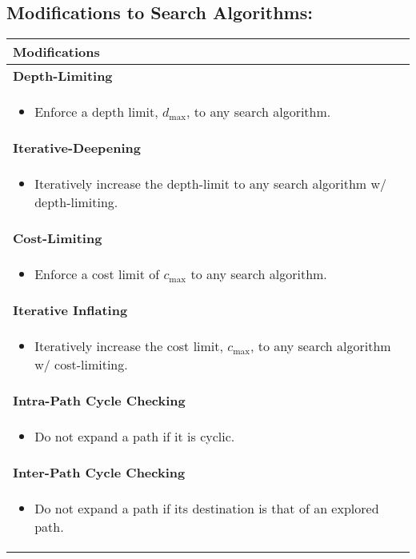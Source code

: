 \subsection{Modifications to Search Algorithms:}
\begin{summary}
    \begin{center}
        \begin{tabular}{l}
        \toprule
        \textbf{Modifications} \\
        \midrule
        \textbf{Depth-Limiting} \\
        \multicolumn{1}{p{\linewidth}}{
        \begin{itemize}
            \item Enforce a depth limit, $d_{\text{max}}$, to any search algorithm.
        \end{itemize}} \\
        \midrule
        \textbf{Iterative-Deepening} \\
        \multicolumn{1}{p{\linewidth}}{
        \begin{itemize}
            \item Iteratively increase the depth-limit to any search algorithm w/ depth-limiting.
        \end{itemize}} \\
        \midrule
        \textbf{Cost-Limiting} \\
        \multicolumn{1}{p{\linewidth}}{
        \begin{itemize}
            \item Enforce a cost limit of $c_\text{max}$ to any search algorithm.
        \end{itemize}} \\
        \midrule
        \textbf{Iterative Inflating} \\
        \multicolumn{1}{p{\linewidth}}{
        \begin{itemize}
            \item Iteratively increase the cost limit, $c_{\text{max}}$, to any search algorithm w/ cost-limiting.
        \end{itemize}} \\
        \midrule
        \textbf{Intra-Path Cycle Checking} \\
        \multicolumn{1}{p{\linewidth}}{
        \begin{itemize}
            \item Do not expand a path if it is cyclic.
        \end{itemize}} \\
        \midrule
        \textbf{Inter-Path Cycle Checking} \\
        \multicolumn{1}{p{\linewidth}}{
        \begin{itemize}
            \item Do not expand a path if its destination is that of an explored path. 
        \end{itemize}} \\
        \bottomrule
        \end{tabular}
    \end{center}
\end{summary}
\newpage

